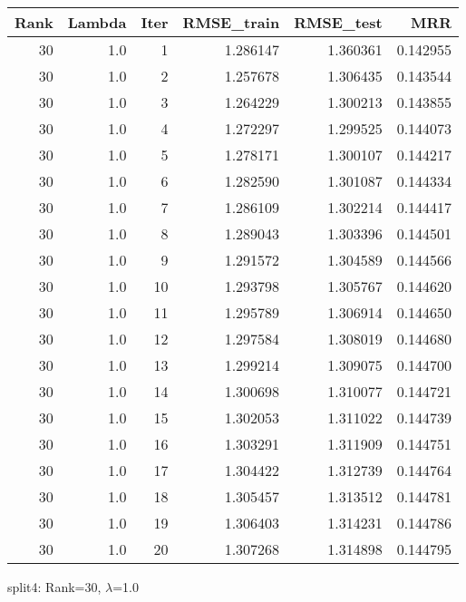 \begin{tabular}{rrrrrr}
\toprule
 Rank &  Lambda &  Iter &  RMSE\_train &  RMSE\_test &       MRR \\
\midrule
   30 &     1.0 &     1 &    1.286147 &   1.360361 &  0.142955 \\
   30 &     1.0 &     2 &    1.257678 &   1.306435 &  0.143544 \\
   30 &     1.0 &     3 &    1.264229 &   1.300213 &  0.143855 \\
   30 &     1.0 &     4 &    1.272297 &   1.299525 &  0.144073 \\
   30 &     1.0 &     5 &    1.278171 &   1.300107 &  0.144217 \\
   30 &     1.0 &     6 &    1.282590 &   1.301087 &  0.144334 \\
   30 &     1.0 &     7 &    1.286109 &   1.302214 &  0.144417 \\
   30 &     1.0 &     8 &    1.289043 &   1.303396 &  0.144501 \\
   30 &     1.0 &     9 &    1.291572 &   1.304589 &  0.144566 \\
   30 &     1.0 &    10 &    1.293798 &   1.305767 &  0.144620 \\
   30 &     1.0 &    11 &    1.295789 &   1.306914 &  0.144650 \\
   30 &     1.0 &    12 &    1.297584 &   1.308019 &  0.144680 \\
   30 &     1.0 &    13 &    1.299214 &   1.309075 &  0.144700 \\
   30 &     1.0 &    14 &    1.300698 &   1.310077 &  0.144721 \\
   30 &     1.0 &    15 &    1.302053 &   1.311022 &  0.144739 \\
   30 &     1.0 &    16 &    1.303291 &   1.311909 &  0.144751 \\
   30 &     1.0 &    17 &    1.304422 &   1.312739 &  0.144764 \\
   30 &     1.0 &    18 &    1.305457 &   1.313512 &  0.144781 \\
   30 &     1.0 &    19 &    1.306403 &   1.314231 &  0.144786 \\
   30 &     1.0 &    20 &    1.307268 &   1.314898 &  0.144795 \\
\bottomrule
\end{tabular}

\caption{split4: Rank=30, $\lambda$=1.0}

